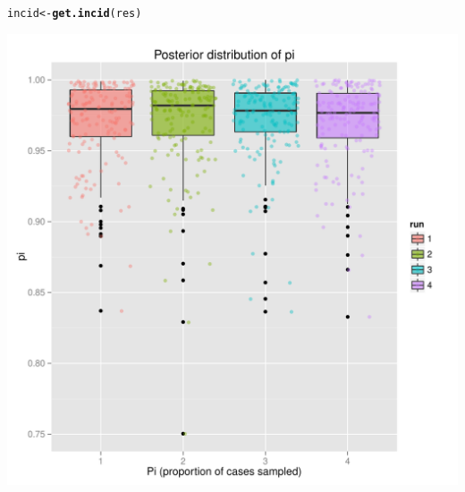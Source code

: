 \documentclass{article}\usepackage[]{graphicx}\usepackage[]{color}
\makeatletter
\newcommand{\hlstd}[1]{\textcolor[rgb]{0.345,0.345,0.345}{#1}}%
\newcommand{\hlkwb}[1]{\textcolor[rgb]{0.69,0.353,0.396}{#1}}%
\newcommand{\hlkwd}[1]{\textcolor[rgb]{0.737,0.353,0.396}{\textbf{#1}}}%
\newenvironment{kframe}{%
 \def\at@end@of@kframe{}%
 \ifinner\ifhmode%
  \def\at@end@of@kframe{\end{minipage}}%
  \begin{minipage}{\columnwidth}%
 \fi\fi%
 \def\FrameCommand##1{\hskip\@totalleftmargin \hskip-\fboxsep
 \colorbox{shadecolor}{##1}\hskip-\fboxsep
     \hskip-\linewidth \hskip-\@totalleftmargin \hskip\columnwidth}%
 \MakeFramed {\advance\hsize-\width
   \@totalleftmargin\z@ \linewidth\hsize
   \@setminipage}}%
 {\par\unskip\endMakeFramed%
 \at@end@of@kframe}
\newenvironment{knitrout}{}{} %
\makeatother
\begin{document}
\begin{knitrout}
\color{fgcolor}\begin{kframe}
\begin{alltt}
\hlstd{incid} \hlkwb{<-} \hlkwd{get.incid}\hlstd{(res)}
\end{alltt}
\end{kframe}

{\centering \includegraphics[width=.6\textwidth]{figs/unnamed-chunk-40} 

}



\end{knitrout}
\end{document}
